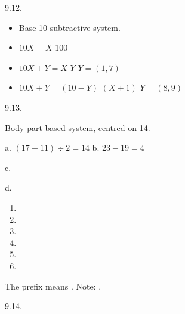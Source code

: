 \begin{refsection}
\begin{practiceproblemsolution}{9.12. \langnameSelkup}
\begin{itemize}
    \item Base-10 subtractive system.
    \item $10X = X$	\hfill	100 = 
    \item $10X + Y = X$ $Y$ \hfill $Y = (1,7)$
    \item $10X + Y = (10-Y)$  $(X+1)$ \hfill $Y=(8,9)$
\end{itemize}
\end{practiceproblemsolution}

\begin{practiceproblemsolution}{9.13. \langnameVambon}

 Body-part-based system, centred on 14.

\begin{solutions}[label=Solution 9.13\alph*]
    \item a. $(17+11) \div 2 = 14$ \quad\quad\quad\quad\quad\quad  b. $23-19=4$
    \item c. 
    \itemsep0in
    \item[] d. 
    \item
    \begin{multicols}{3}
        \begin{enumerate}[label = \alph*., start = 5,leftmargin = 1em]

            \item {}
            \item {}
            \item {}
            \item {}
            \item {}
            \item[]
        \end{enumerate}
    \end{multicols}
    \item The prefix  means . Note: .
\end{solutions}
\end{practiceproblemsolution}

\begin{practiceproblemsolution}{9.14. \langnameAlamblak}
\begin{solutions}[label=Solution 9.14\alph*]
    \item
    \begin{multicols}{5}


\end{multicols}
\end{solutions}
\end{practiceproblemsolution}
\end{refsection}
